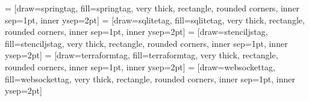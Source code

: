  = [draw=springtag, fill=springtag, very thick, rectangle, rounded corners, inner sep=1pt, inner ysep=2pt]
\newcommand{\springtag}{\begin{tikzpicture}\node [springtag] (box){{\scriptsize \textbf{\phantom{|}Spring\phantom{|}}}};\end{tikzpicture}}
 = [draw=sqlitetag, fill=sqlitetag, very thick, rectangle, rounded corners, inner sep=1pt, inner ysep=2pt]
\newcommand{\sqlitetag}{\begin{tikzpicture}\node [sqlitetag] (box){{\scriptsize \textbf{\phantom{|}SQLite\phantom{|}}}};\end{tikzpicture}}
 = [draw=stenciljstag, fill=stenciljstag, very thick, rectangle, rounded corners, inner sep=1pt, inner ysep=2pt]
\newcommand{\stenciljstag}{\begin{tikzpicture}\node [stenciljstag] (box){{\scriptsize \textbf{\phantom{|}StencilJS\phantom{|}}}};\end{tikzpicture}}
 = [draw=terraformtag, fill=terraformtag, very thick, rectangle, rounded corners, inner sep=1pt, inner ysep=2pt]
\newcommand{\terraformtag}{\begin{tikzpicture}\node [terraformtag] (box){{\scriptsize \color{white}{\textbf{\phantom{|}Terraform\phantom{|}}}}};\end{tikzpicture}}
 = [draw=websockettag, fill=websockettag, very thick, rectangle, rounded corners, inner sep=1pt, inner ysep=2pt]
\newcommand{\websockettag}{\begin{tikzpicture}\node [websockettag] (box){{\scriptsize \textbf{\phantom{|}WebSocket\phantom{|}}}};\end{tikzpicture}}
